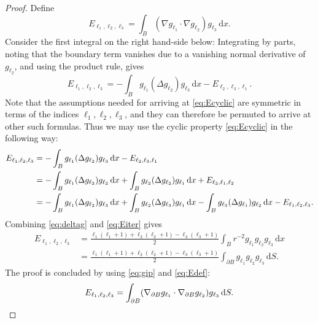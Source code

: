 \documentclass[reqno]{amsart}
\numberwithin{equation}{section}
\numberwithin{figure}{section}
\numberwithin{table}{section}
\theoremstyle{plain}
\theoremstyle{definition}
\theoremstyle{remark}
\newcommand{\di}{\mathrm{d}}   %
\begin{document}
\begin{proof}
    Define
    \begin{equation} \label{eq:Edef}
        E_{\ell_1,\ell_2,\ell_3} = \int_{B} (\nabla g_{\ell_1} \cdot \nabla g_{\ell_2}) g_{\ell_3} \, \di x.
    \end{equation}
    Consider the first integral on the right hand-side below: Integrating by parts, noting that the boundary term vanishes due to a vanishing normal derivative of $g_{\ell_2}$, and using the product rule, gives
    \begin{equation} \label{eq:Ecyclic}
        E_{\ell_1,\ell_2,\ell_3} = -\int_B g_{\ell_1}(\Delta g_{\ell_2})g_{\ell_3}\,\di x - E_{\ell_2,\ell_3,\ell_1}.
    \end{equation}
    Note that the assumptions needed for arriving at \eqref{eq:Ecyclic} are symmetric in terms of the indices $\ell_1,\ell_2,\ell_3$, and they can therefore be permuted to arrive at other such formulas. Thus we may use the cyclic property \eqref{eq:Ecyclic} in the following way:
    \begin{align}
        E_{\ell_1,\ell_2,\ell_3} &= -\int_B g_{\ell_1}(\Delta g_{\ell_2})g_{\ell_3}\,\di x - E_{\ell_2,\ell_3,\ell_1} \notag \\
   		&= -\int_B g_{\ell_1}(\Delta g_{\ell_2})g_{\ell_3}\,\di x + \int_B g_{\ell_2}(\Delta g_{\ell_3})g_{\ell_1}\,\di x + E_{\ell_3,\ell_1,\ell_2} \notag \\
   		&= -\int_B g_{\ell_1}(\Delta g_{\ell_2})g_{\ell_3}\,\di x + \int_B g_{\ell_2}(\Delta g_{\ell_3})g_{\ell_1}\,\di x - \int_B g_{\ell_3}(\Delta g_{\ell_1})g_{\ell_2}\,\di x - E_{\ell_1,\ell_2,\ell_3}. \label{eq:Eiter}
    \end{align}
    Combining \eqref{eq:deltag} and \eqref{eq:Eiter} gives
    \begin{align*}
        E_{\ell_1,\ell_2,\ell_3} &= \frac{\ell_1 (\ell_1 + 1) + \ell_2 (\ell_2 + 1) - \ell_3 (\ell_3 + 1)}{2} \int_{B} r^{-2}g_{\ell_1} g_{\ell_2} g_{\ell_3} \, \di x \\
   		&= \frac{\ell_1 (\ell_1 + 1) + \ell_2 (\ell_2 + 1) - \ell_3 (\ell_3 + 1)}{2} \int_{\partial B} g_{\ell_1} g_{\ell_2} g_{\ell_3} \, \di S.
    \end{align*}    	
    The proof is concluded by using \eqref{eq:gip} and \eqref{eq:Edef}:
    \begin{equation*}
        E_{\ell_1,\ell_2,\ell_3} = \int_{\partial B} (\nabla_{\partial B} g_{\ell_1} \cdot \nabla_{\partial B} g_{\ell_2}) g_{\ell_3} \, \di S. \qedhere
    \end{equation*}
\end{proof}
\end{document}
